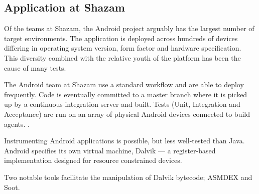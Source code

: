 \subsection{Application at Shazam}

Of the teams at Shazam, the Android project arguably has the largest number of target environments. The application is deployed across hundreds of devices differing in operating system version, form factor and hardware specification. This diversity combined with the relative youth of the platform has been the cause of many \flaky{} tests.

The Android team at Shazam use a standard workflow and are able to deploy frequently. Code is eventually committed to a master branch where it is picked up by a continuous integration server and built. Tests (Unit, Integration and Acceptance) are run on an array of physical Android devices connected to build agents. .

Instrumenting Android applications is possible, but less well-tested than Java. Android specifies its own virtual machine, Dalvik\cite{dalvik} --- a register-based implementation designed for resource constrained devices.

Two notable tools facilitate the manipulation of Dalvik bytecode; ASMDEX\cite{asmDex} and Soot\cite{vall99soot}.
